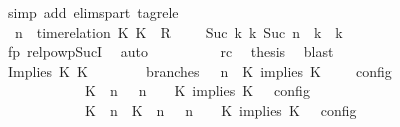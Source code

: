 \begin{isabellebody}
\ {\isacharparenleft}simp\ add{\isacharcolon}\ elims{\isacharunderscore}part\ tagrel{\isacharunderscore}e{\isacharparenright}\isanewline
\ \ \ \ \ \ \ \ \isamarkupfalse%
\ {\isacartoucheopen}{\isacharparenleft}{\isasymGamma}{\isacharcomma}\ n\ {\isasymturnstile}\ {\isacharparenleft}time{\isacharminus}relation\ {\isasymlfloor}K\ K\ {\isasymin}\ R{\isacharparenright}\ {\isacharhash}\ {\isasymPsi}\ {\isasymtriangleright}\ {\isasymPhi}{\isacharparenright}\ {\isasymhookrightarrow}\isactrlbsup Suc\ k\isactrlesup \ {\isacharparenleft}{\isasymGamma}\isactrlsub k{\isacharcomma}\ Suc\ n\ {\isasymturnstile}\ {\isasymPsi}\isactrlsub k\ {\isasymtriangleright}\ {\isasymPhi}\isactrlsub k{\isacharparenright}{\isacartoucheclose}\isanewline
\ \ \ \ \ \ \ \ \ \ \isamarkupfalse%
\ fp\ relpowp{\isacharunderscore}Suc{\isacharunderscore}I{}\ \isamarkupfalse%
\ auto\isanewline
\ \ \ \ \ \ \ \ \isamarkupfalse%
\ rc\ \isamarkupfalse%
\ {\isacharquery}thesis\ \isamarkupfalse%
\ blast\isanewline
\ \ \ \ \ \ \isamarkupfalse%
\isanewline
\ \ \isamarkupfalse%
\isanewline
\ \ \ \ \isamarkupfalse%
\ {\isacharparenleft}Implies\ K\ K\isanewline
\ \ \ \ \ \ \isamarkupfalse%
\ branches{\isacharcolon}\ {\isacartoucheopen}{\isasymlbrakk}\ {\isasymGamma}{\isacharcomma}\ n\ {\isasymturnstile}\ {\isacharparenleft}{\isacharparenleft}K\ implies\ K\ {\isacharhash}\ {\isasymPsi}{\isacharparenright}\ {\isasymtriangleright}\ {\isasymPhi}\ {\isasymrbrakk}\isactrlsub c\isactrlsub o\isactrlsub n\isactrlsub f\isactrlsub i\isactrlsub g\isanewline
\ \ \ \ \ \ \ \ \ \ {\isacharequal}\ {\isasymlbrakk}\ {\isacharparenleft}{\isacharparenleft}K\ {\isasymnot}{\isasymUp}\ n{\isacharparenright}\ {\isacharhash}\ {\isasymGamma}{\isacharparenright}{\isacharcomma}\ n\ {\isasymturnstile}\ {\isasymPsi}\ {\isasymtriangleright}\ {\isacharparenleft}{\isacharparenleft}K\ implies\ K\ {\isacharhash}\ {\isasymPhi}{\isacharparenright}\ {\isasymrbrakk}\isactrlsub c\isactrlsub o\isactrlsub n\isactrlsub f\isactrlsub i\isactrlsub g\isanewline
\ \ \ \ \ \ \ \ \ \ {\isasymunion}\ {\isasymlbrakk}\ {\isacharparenleft}{\isacharparenleft}K\ {\isasymUp}\ n{\isacharparenright}\ {\isacharhash}\ {\isacharparenleft}K\ {\isasymUp}\ n{\isacharparenright}\ {\isacharhash}\ {\isasymGamma}{\isacharparenright}{\isacharcomma}\ n\ {\isasymturnstile}\ {\isasymPsi}\ {\isasymtriangleright}\ {\isacharparenleft}{\isacharparenleft}K\ implies\ K\ {\isacharhash}\ {\isasymPhi}{\isacharparenright}\ {\isasymrbrakk}\isactrlsub c\isactrlsub o\isactrlsub n\isactrlsub f\isactrlsub i\isactrlsub g{\isacartoucheclose}\isanewline

\end{isabellebody}
